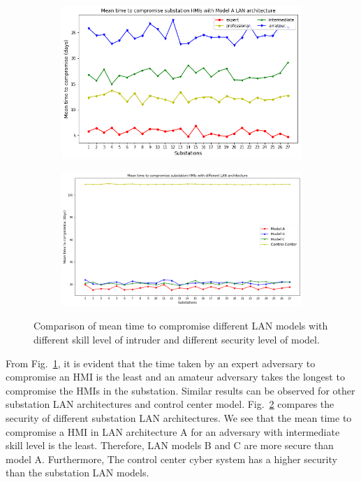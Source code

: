 \begin{figure}[htbp]
	\centering
	\begin{subfigure}{0.24\textwidth}
	\centering
	\includegraphics[width=\textwidth]{fig-resultA.png}
	\caption{}
	\label{sfig:result-A}
	\end{subfigure}
	\begin{subfigure}{0.24\textwidth}
	\centering
	\includegraphics[width=\textwidth]{figs/fig-compare-model.png}
	\caption{}
	\label{sfig:result-compare}
	\end{subfigure}
	\caption{Comparison of mean time to compromise different LAN models with different skill level of intruder and different security level of model.}
	\label{fig:result-1}
\end{figure}
From Fig.~\ref{sfig:result-A}, it is evident that the time taken by an expert adversary to compromise an HMI is the least and an amateur adversary takes the longest to compromise the HMIs in the substation. Similar results can be observed for other substation LAN architectures and control center model. Fig.~\ref{sfig:result-compare} compares the security of different substation LAN architectures. We see that the mean time to compromise a HMI in LAN architecture A for an adversary with intermediate skill level is the least. Therefore, LAN models B and C are more secure than model A. Furthermore, The control center cyber system has a higher security than the substation LAN models.

